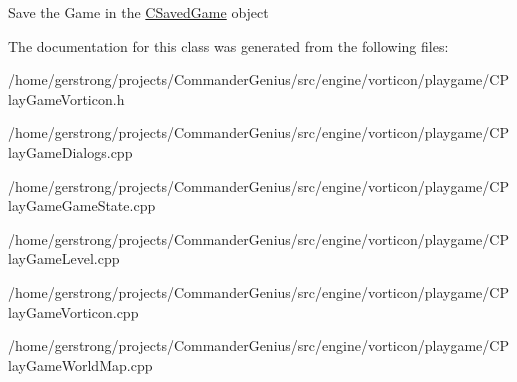 Save the Game in the \hyperlink{class_c_saved_game}{CSavedGame} object 



The documentation for this class was generated from the following files:\begin{DoxyCompactItemize}
\item 
/home/gerstrong/projects/CommanderGenius/src/engine/vorticon/playgame/CPlayGameVorticon.h\item 
/home/gerstrong/projects/CommanderGenius/src/engine/vorticon/playgame/CPlayGameDialogs.cpp\item 
/home/gerstrong/projects/CommanderGenius/src/engine/vorticon/playgame/CPlayGameGameState.cpp\item 
/home/gerstrong/projects/CommanderGenius/src/engine/vorticon/playgame/CPlayGameLevel.cpp\item 
/home/gerstrong/projects/CommanderGenius/src/engine/vorticon/playgame/CPlayGameVorticon.cpp\item 
/home/gerstrong/projects/CommanderGenius/src/engine/vorticon/playgame/CPlayGameWorldMap.cpp\end{DoxyCompactItemize}
